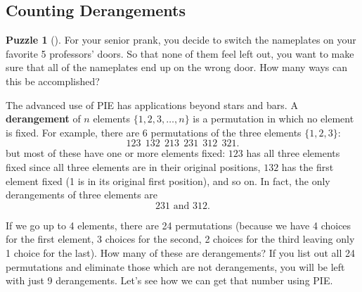 \documentclass[10pt,]{book}
\newcommand{\terminology}[1]{\textbf{#1}}
\theoremstyle{plain}
\theoremstyle{definition}
\theoremstyle{definition}
\theoremstyle{definition}
\newtheorem{investigation}[project]{Puzzle}
\numberwithin{equation}{chapter}
\begin{document}
\subsection[{Counting Derangements}]{Counting Derangements}\label{subsec_derangements}
\begin{investigation}[]\label{investigation-9}
\hypertarget{p-1097}{}%
For your senior prank, you decide to switch the nameplates on your favorite 5 professors' doors. So that none of them feel left out, you want to make sure that all of the nameplates end up on the wrong door. How many ways can this be accomplished?%
\end{investigation}
\hypertarget{p-1098}{}%
The advanced use of PIE has applications beyond stars and bars. A \terminology{derangement} of \(n\) elements \(\{1,2,3,\ldots, n\}\) is a permutation in which no element is fixed. For example, there are \(6\) permutations of the three elements \(\{1,2,3\}\):%
\begin{equation*}
123 ~~ 132 ~~ 213 ~~ 231 ~~ 312 ~~ 321.
\end{equation*}
but most of these have one or more elements fixed: \(123\) has all three elements fixed since all three elements are in their original positions, \(132\) has the first element fixed (1 is in its original first position), and so on. In fact, the only derangements of three elements are%
\begin{equation*}
231 \text{ and } 312.
\end{equation*}
%
\par
\hypertarget{p-1099}{}%
If we go up to 4 elements, there are 24 permutations (because we have 4 choices for the first element, 3 choices for the second, 2 choices for the third leaving only 1 choice for the last). How many of these are derangements? If you list out all 24 permutations and eliminate those which are not derangements, you will be left with just 9 derangements. Let's see how we can get that number using PIE.%
\end{document}
